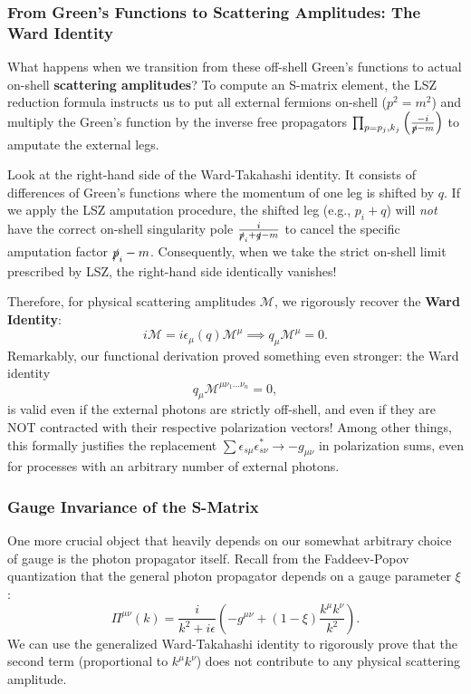 \subsubsection{From Green's Functions to Scattering Amplitudes: The Ward Identity}

What happens when we transition from these off-shell Green's functions to actual on-shell \textbf{scattering amplitudes}?
To compute an S-matrix element, the LSZ reduction formula instructs us to put all external fermions on-shell ($p^2 = m^2$) and multiply the Green's function by the inverse free propagators $\prod_{p=p_j , k_j} \left(\frac{-i}{\slashed{p} - m}\right)$ to amputate the external legs.

Look at the right-hand side of the Ward-Takahashi identity. It consists of differences of Green's functions where the momentum of one leg is shifted by $q$. If we apply the LSZ amputation procedure, the shifted leg (e.g., $p_i + q$) will \textit{not} have the correct on-shell singularity pole $\frac{i}{\slashed{p}_i + \slashed{q} - m}$ to cancel the specific amputation factor $\slashed{p}_i - m$.
Consequently, when we take the strict on-shell limit prescribed by LSZ, the right-hand side identically vanishes!

Therefore, for physical scattering amplitudes $\mathcal{M}$, we rigorously recover the \textbf{Ward Identity}:
\[
    i\mathcal{M} = i\epsilon_\mu(q)\mathcal{M}^\mu \implies q_\mu \mathcal{M}^\mu = 0.
\]
Remarkably, our functional derivation proved something even stronger: the Ward identity
\[
    q_\mu \mathcal{M}^{\mu \nu_1 \dots \nu_n} = 0,
\]
is valid even if the external photons are strictly off-shell, and even if they are NOT contracted with their respective polarization vectors!
Among other things, this formally justifies the replacement $\sum \epsilon_{s\mu} \epsilon_{s\nu}^* \to -g_{\mu\nu}$ in polarization sums, even for processes with an arbitrary number of external photons.

\subsubsection{Gauge Invariance of the S-Matrix}

One more crucial object that heavily depends on our somewhat arbitrary choice of gauge is the photon propagator itself. Recall from the Faddeev-Popov quantization that the general photon propagator depends on a gauge parameter $\xi$:
\[
    \Pi^{\mu\nu}(k) = \frac{i}{k^2 + i\epsilon} \left( -g^{\mu\nu} + (1-\xi) \frac{k^\mu k^\nu}{k^2} \right).
\]
We can use the generalized Ward-Takahashi identity to rigorously prove that the second term (proportional to $k^\mu k^\nu$) does not contribute to any physical scattering amplitude.

